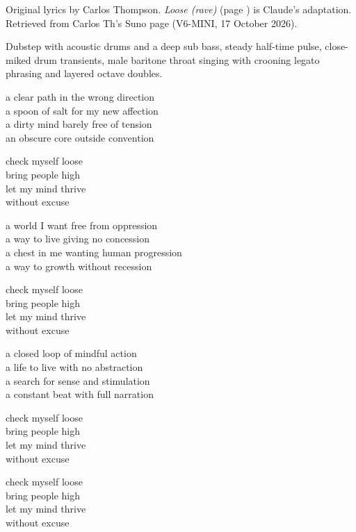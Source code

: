 
\label{sec:loose}
\begin{notes}
Original lyrics by Carlos Thompson. \emph{Loose (rave)} (page \pageref{sec:loose-rave}) is Claude's adaptation. Retrieved from Carlos Th's Suno page (V6-MINI, 17 October 2026).
\end{notes}
\begin{style}
Dubstep with acoustic drums and a deep sub bass, steady half-time pulse, close-miked drum transients, male baritone throat singing with crooning legato phrasing and layered octave doubles.
\end{style}
\begin{lyrics}
a clear path in the wrong direction\\
a spoon of salt for my new affection\\
a dirty mind barely free of tension\\
an obscure core outside convention

check myself loose\\
bring people high\\
let my mind thrive\\
without excuse

a world I want free from oppression\\
a way to live giving no concession\\
a chest in me wanting human progression\\
a way to growth without recession

check myself loose\\
bring people high\\
let my mind thrive\\
without excuse

a closed loop of mindful action\\
a life to live with no abstraction\\
a search for sense and stimulation\\
a constant beat with full narration

check myself loose\\
bring people high\\
let my mind thrive\\
without excuse

check myself loose\\
bring people high\\
let my mind thrive\\
without excuse
\end{lyrics}

